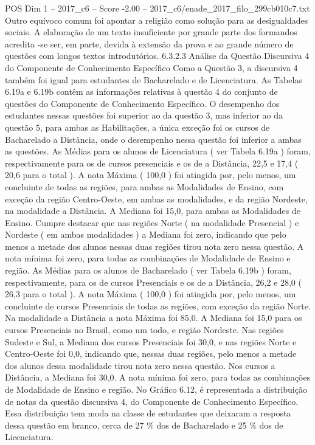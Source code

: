 \begin{textsample}{POS Dim 1 – 2017\_c6 – Score -2.00 – 2017\_c6/enade\_2017\_filo\_299cb010c7.txt}
Outro equívoco comum foi apontar a religião como solução para as desigualdades sociais.
A elaboração de um texto insuficiente por grande parte dos formandos acredita -se ser, em parte, devida à extensão da prova e ao grande número de questões com longos textos introdutórios. 6.3.2.3 Análise da Questão Discursiva 4 do Componente de Conhecimento Específico Como a Questão 3, a discursiva 4 também foi igual para estudantes de Bacharelado e de Licenciatura.
As Tabelas 6.19a e 6.19b contêm as informações relativas à questão 4 do conjunto de questões do Componente de Conhecimento Específico.
O desempenho dos estudantes nessas questões foi superior ao da questão 3, mas inferior ao da questão 5, para ambas as Habilitações, a única exceção foi os cursos de Bacharelado a Distância, onde o desempenho nessa questão foi inferior a ambas as questões.
As Médias para os alunos de Licenciatura ( ver Tabela 6.19a ) foram, respectivamente para os de cursos presenciais e os de a Distância, 22,5 e 17,4 ( 20,6 para o total ).
A nota Máxima ( 100,0 ) foi atingida por, pelo menos, um concluinte de todas as regiões, para ambas as Modalidades de Ensino, com exceção da região Centro-Oeste, em ambas as modalidades, e da região Nordeste, na modalidade a Distância.
A Mediana foi 15,0, para ambas as Modalidades de Ensino.
Cumpre destacar que nas regiões Norte ( na modalidade Presencial ) e Nordeste ( em ambas modalidades ) a Mediana foi zero, indicando que pelo menos a metade dos alunos nessas duas regiões tirou nota zero nessa questão.
A nota mínima foi zero, para todas as combinações de Modalidade de Ensino e região.
As Médias para os alunos de Bacharelado ( ver Tabela 6.19b ) foram, respectivamente, para os de cursos Presenciais e os de a Distância, 26,2 e 28,0 ( 26,3 para o total ).
A nota Máxima ( 100,0 ) foi atingida por, pelo menos, um concluinte de cursos Presenciais de todas as regiões, com exceção da região Norte.
Na modalidade a Distância a nota Máxima foi 85,0.
A Mediana foi 15,0 para os cursos Presenciais no Brasil, como um todo, e região Nordeste.
Nas regiões Sudeste e Sul, a Mediana dos cursos Presenciais foi 30,0, e nas regiões Norte e Centro-Oeste foi 0,0, indicando que, nessas duas regiões, pelo menos a metade dos alunos dessa modalidade tirou nota zero nessa questão.
Nos cursos a Distância, a Mediana foi 30,0.
A nota mínima foi zero, para todas as combinações de Modalidade de Ensino e região.
No Gráfico 6.12, é representada a distribuição de notas da questão discursiva 4, do Componente de Conhecimento Específico.
Essa distribuição tem moda na classe de estudantes que deixaram a resposta dessa questão em branco, cerca de 27 \% dos de Bacharelado e 25 \% dos de Licenciatura.

\end{textsample}
